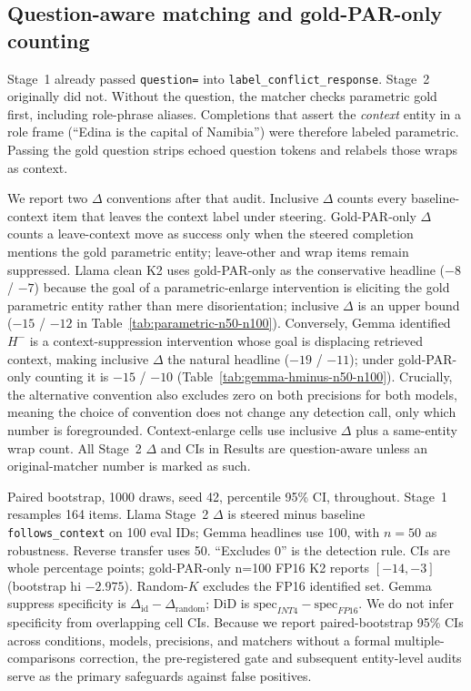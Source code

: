 \documentclass{article} %
\begin{document}
\subsection{Question-aware matching and gold-PAR-only counting}
\label{sec:matcher}

Stage~1 already passed \texttt{question=} into \texttt{label\_conflict\_response}. Stage~2 originally did not. Without the question, the matcher checks parametric gold first, including role-phrase aliases. Completions that assert the \emph{context} entity in a role frame (``Edina is the capital of Namibia'') were therefore labeled parametric. Passing the gold question strips echoed question tokens and relabels those wraps as context.

We report two $\Delta$ conventions after that audit. Inclusive $\Delta$ counts every baseline-context item that leaves the context label under steering. Gold-PAR-only $\Delta$ counts a leave-context move as success only when the steered completion mentions the gold parametric entity; leave-other and wrap items remain suppressed. Llama clean K2 uses gold-PAR-only as the conservative headline ($-8$ / $-7$) because the goal of a parametric-enlarge intervention is eliciting the gold parametric entity rather than mere disorientation; inclusive $\Delta$ is an upper bound ($-15$ / $-12$ in Table~\ref{tab:parametric-n50-n100}). Conversely, Gemma identified $H^{-}$ is a context-suppression intervention whose goal is displacing retrieved context, making inclusive $\Delta$ the natural headline ($-19$ / $-11$); under gold-PAR-only counting it is $-15$ / $-10$ (Table~\ref{tab:gemma-hminus-n50-n100}). Crucially, the alternative convention also excludes zero on both precisions for both models, meaning the choice of convention does not change any detection call, only which number is foregrounded. Context-enlarge cells use inclusive $\Delta$ plus a same-entity wrap count. All Stage~2 $\Delta$ and CIs in Results are question-aware unless an original-matcher number is marked as such.

Paired bootstrap, 1000 draws, seed 42, percentile 95\% CI, throughout. Stage~1 resamples 164 items. Llama Stage~2 $\Delta$ is steered minus baseline \texttt{follows\_context} on 100 eval IDs; Gemma headlines use 100, with $n{=}50$ as robustness. Reverse transfer uses 50. ``Excludes 0'' is the detection rule. CIs are whole percentage points; gold-PAR-only n=100 FP16 K2 reports $[-14,-3]$ (bootstrap hi $-2.975$). Random-$K$ excludes the FP16 identified set. Gemma suppress specificity is $\Delta_{\mathrm{id}}-\Delta_{\mathrm{random}}$; DiD is $\mathrm{spec}_{INT4}-\mathrm{spec}_{FP16}$. We do not infer specificity from overlapping cell CIs. Because we report paired-bootstrap 95\% CIs across conditions, models, precisions, and matchers without a formal multiple-comparisons correction, the pre-registered gate and subsequent entity-level audits serve as the primary safeguards against false positives.
\end{document}
